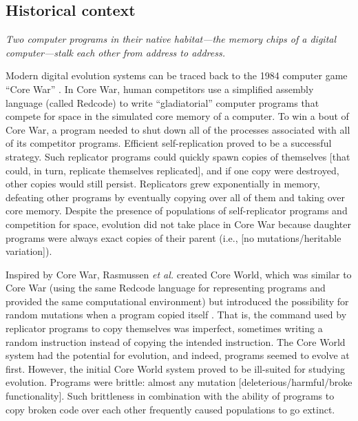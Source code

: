 \subsection{Historical context}

\begin{displayquote}

\textit{Two computer programs in their native habitat---the memory chips of a digital computer---stalk each other from address to address.}  \citep{dewdney_core_wars_1984}
\end{displayquote}

Modern digital evolution systems can be traced back to the 1984 computer game ``Core War'' \citep{dewdney_core_wars_1984}.
In Core War, human competitors use a simplified assembly language (called Redcode) to write ``gladiatorial'' computer programs that compete for space in the simulated core memory of a computer.
To win a bout of Core War, a program needed to shut down all of the processes associated with all of its competitor programs.
Efficient self-replication proved to be a successful strategy.
Such replicator programs could quickly spawn copies of themselves [that could, in turn, replicate themselves replicated], and if one copy were destroyed, other copies would still persist. 
Replicators grew exponentially in memory, defeating other programs by eventually copying over all of them and taking over core memory.
Despite the presence of populations of self-replicator programs and competition for space, evolution did not take place in Core War because daughter programs were always exact copies of their parent (i.e., [no mutations/heritable variation]).

Inspired by Core War, Rasmussen \textit{et al.} created Core World, which was similar to Core War (using the same Redcode language for representing programs and provided the same computational environment) but introduced the possibility for random mutations when a program copied itself \citep{rasmussen_core_1989,rasmussen_coreworld_1990}.
That is, the command used by replicator programs to copy themselves was imperfect, sometimes writing a random instruction instead of copying the intended instruction. 
The Core World system had the potential for evolution, and indeed, programs seemed to evolve at first.
However, the initial Core World system proved to be ill-suited for studying evolution.
Programs were brittle: almost any mutation [deleterious/harmful/broke functionality].
Such brittleness in combination with the ability of programs to copy broken code over each other frequently caused populations to go extinct.

